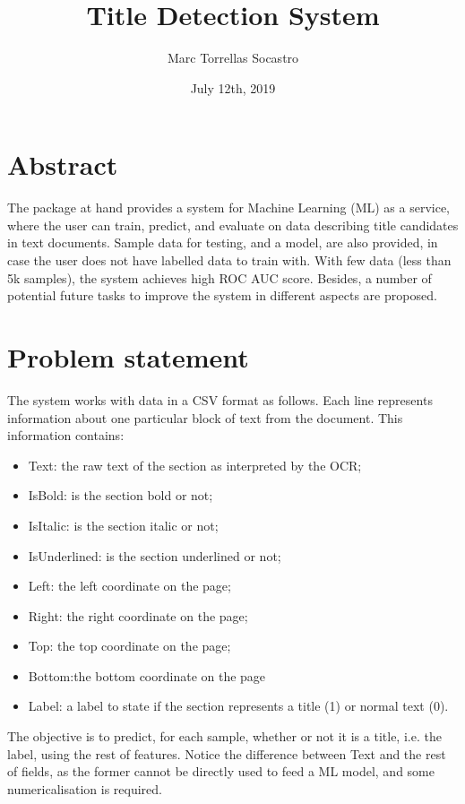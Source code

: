\documentclass[11pt, oneside]{article}   	%
\title{Title Detection System}
\author{Marc Torrellas Socastro}
\date{July 12th, 2019}					%
\begin{document}
\maketitle
\section{Abstract}

The package at hand provides a system for Machine Learning (ML) as a service, where the user can train, predict, and evaluate on data describing title candidates in text documents. Sample data for testing, and a model, are also provided, in case the user does not have labelled data to train with. With few data (less than 5k samples), the system achieves high ROC AUC score. Besides, a number of potential future tasks to improve the system in different aspects are proposed.

\section{Problem statement}

The system works with data in a CSV format as follows. Each line represents information about one particular block of text from the document. This information contains:
\begin{itemize}
\item Text: the raw text of the section as interpreted by the OCR;
\item IsBold: is the section bold or not;
\item IsItalic: is the section italic or not;
\item IsUnderlined: is the section underlined or not;
\item Left: the left coordinate on the page;
\item Right: the right coordinate on the page;
\item Top: the top coordinate on the page;
\item Bottom:the bottom coordinate on the page
\item Label: a label to state if the section represents a title (1) or normal text (0). 
\end{itemize}

The objective is to predict, for each sample, whether or not it is a title, i.e. the label, using the rest of features. Notice the difference between Text and the rest of fields, as the former cannot be directly used to feed a ML model, and some numericalisation is required.
\end{document}
